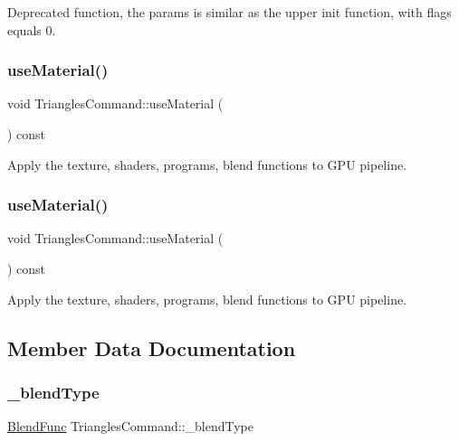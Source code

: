 Deprecated function, the params is similar as the upper init function, with flags equals 0. \mbox{\label{classTrianglesCommand_ad55143235c591c8387090eac066f9993}} 
\subsubsection{\texorpdfstring{use\+Material()}{useMaterial()}\hspace{0.1cm}{\footnotesize\ttfamily [1/2]}}
{\footnotesize\ttfamily void Triangles\+Command\+::use\+Material (\begin{DoxyParamCaption}{ }\end{DoxyParamCaption}) const}

Apply the texture, shaders, programs, blend functions to G\+PU pipeline. \mbox{\label{classTrianglesCommand_ad55143235c591c8387090eac066f9993}} 
\subsubsection{\texorpdfstring{use\+Material()}{useMaterial()}\hspace{0.1cm}{\footnotesize\ttfamily [2/2]}}
{\footnotesize\ttfamily void Triangles\+Command\+::use\+Material (\begin{DoxyParamCaption}{ }\end{DoxyParamCaption}) const}

Apply the texture, shaders, programs, blend functions to G\+PU pipeline. 

\subsection{Member Data Documentation}
\mbox{\label{classTrianglesCommand_abed08224f3a8d837e6fb2a37c2c1d786}} 
\subsubsection{\texorpdfstring{\+\_\+blend\+Type}{\_blendType}}
{\footnotesize\ttfamily \hyperlink{structBlendFunc}{Blend\+Func} Triangles\+Command\+::\+\_\+blend\+Type\hspace{0.3cm}{\ttfamily [protected]}}

